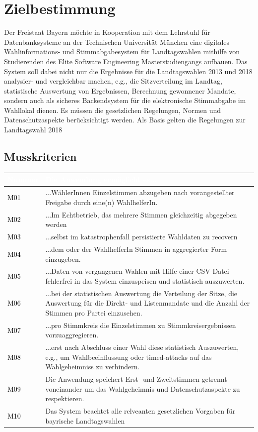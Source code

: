 \documentclass[a4paper,12pt]{article}
\newcommand\addrow[2]{\textcolor{black}{#1} &#2\\ \hline}
\newcommand\addheading[2]{\rowcolor{TUMBlue}\textcolor{white}{#1} & \textcolor{white}{#2}\\ \hline}
\newcommand\tabularhead{\begin{tabular}{|b|p{13cm}|}
\hline
}
\newenvironment{usecase}{\tabularhead}
{\hline\end{tabular}}
\begin{document}
 \setcounter{page}{2}

 \tableofcontents          %
 \clearpage
 
\section{Zielbestimmung}
Der Freistaat Bayern möchte in Kooperation mit dem Lehrstuhl für 
Datenbanksysteme an der Technischen Universität München eine digitales 
Wahlinformations- und Stimmabgabesystem für Landtagswahlen mithilfe von 
Studierenden des Elite Software Engineering Masterstudiengangs aufbauen.
%
Das System soll dabei nicht nur die Ergebnisse für die Landtagswahlen 
2013 und 2018 analysier- und vergleichbar machen, e.g., die Sitzverteilung 
im Landtag, statistische Auswertung von Ergebnissen, Berechnung gewonnener
Mandate, sondern auch als sicheres Backendsystem für die elektronische 
Stimmabgabe im Wahllokal dienen. 
%
Es müssen die gesetzlichen Regelungen, Normen und Datenschutzaspekte
berücksichtigt werden. Als Basis gelten die Regelungen zur
Landtagswahl 2018


\subsection{Musskriterien}
\begin{usecase}
	\addheading{Nummer}{Die Anwendung ermöglicht es...} 
      \addrow{M01}{...WählerInnen Einzelstimmen abzugeben nach vorangestellter Freigabe durch eine(n) WahlhelferIn.}
      \addrow{M02}{...Im Echtbetrieb, das mehrere Stimmen gleichzeitig abgegeben werden}
      \addrow{M03}{...selbst im katastrophenfall persistierte Wahldaten zu recovern}
	\addrow{M04}{...dem oder der WahlhelferIn Stimmen in aggregierter Form einzugeben.}
	\addrow{M05}{...Daten von vergangenen Wahlen mit Hilfe einer CSV-Datei fehlerfrei in das System einzuspeisen und statistisch auszuwerten.}
	\addrow{M06}{...bei der statistischen Auswertung die Verteilung der Sitze, die Auswertung für die Direkt- und Listenmandate und die Anzahl der Stimmen pro Partei einzusehen.}
	\addrow{M07}{...pro Stimmkreis die Einzelstimmen zu Stimmkreisergebnissen vorzuaggregieren.}
	\addrow{M08}{...erst nach Abschluss einer Wahl diese statistisch Auszuwerten, e.g., um Wahlbeeinflussung oder timed-attacks auf das Wahlgeheimniss zu verhindern.}
	\addrow{M09}{Die Anwendung speichert Erst- und Zweitstimmen getrennt voneinander um das Wahlgeheimnis und Datenschutzaspekte zu respektieren.}
      \addrow{M10}{Das System beachtet alle relveanten gesetzlichen Vorgaben für bayrische Landtagswahlen}
\end{usecase}
\end{document}
